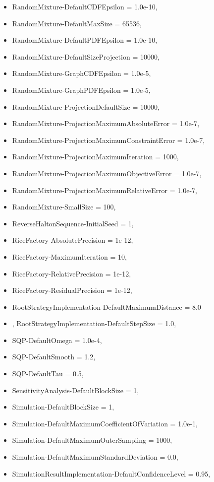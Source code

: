 \begin{itemize}
\item
  RandomMixture-DefaultCDFEpsilon = 1.0e-10,
\item
  RandomMixture-DefaultMaxSize = 65536,
\item
  RandomMixture-DefaultPDFEpsilon = 1.0e-10,
\item
  RandomMixture-DefaultSizeProjection = 10000,
\item
  RandomMixture-GraphCDFEpsilon = 1.0e-5,
\item
  RandomMixture-GraphPDFEpsilon = 1.0e-5,
\item
  RandomMixture-ProjectionDefaultSize = 10000,
\item
  RandomMixture-ProjectionMaximumAbsoluteError = 1.0e-7,
\item
  RandomMixture-ProjectionMaximumConstraintError = 1.0e-7,
\item
  RandomMixture-ProjectionMaximumIteration = 1000,
\item
  RandomMixture-ProjectionMaximumObjectiveError = 1.0e-7,
\item
  RandomMixture-ProjectionMaximumRelativeError = 1.0e-7,
\item
  RandomMixture-SmallSize = 100,
\item
  ReverseHaltonSequence-InitialSeed = 1,
\item
  RiceFactory-AbsolutePrecision = 1e-12,
\item
  RiceFactory-MaximumIteration = 10,
\item
  RiceFactory-RelativePrecision = 1e-12,
\item
  RiceFactory-ResidualPrecision = 1e-12,
\item
  RootStrategyImplementation-DefaultMaximumDistance = 8.0
\item ,
  RootStrategyImplementation-DefaultStepSize = 1.0,
\item
  SQP-DefaultOmega = 1.0e-4,
\item
  SQP-DefaultSmooth = 1.2,
\item
  SQP-DefaultTau = 0.5,
\item
  SensitivityAnalysis-DefaultBlockSize = 1,
\item
  Simulation-DefaultBlockSize = 1,
\item
  Simulation-DefaultMaximumCoefficientOfVariation = 1.0e-1,
\item
  Simulation-DefaultMaximumOuterSampling = 1000,
\item
  Simulation-DefaultMaximumStandardDeviation = 0.0,
\item
  SimulationResultImplementation-DefaultConfidenceLevel = 0.95,

\end{itemize}
